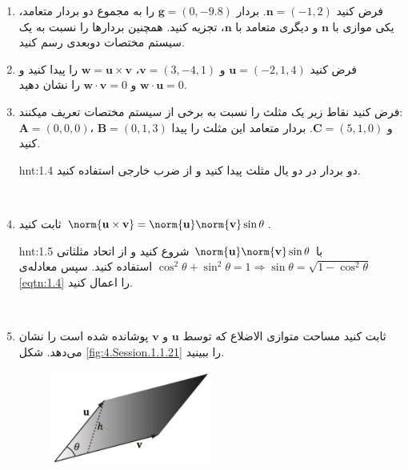 {\begin{spacing}{1.5}
\begin{enumerate}[label=\textbf{\arabic*}.]
\begin{hint}{hnt:1.3}
            \end{hint}
            \\
            \item {فرض کنید $\textbf{n}=(-1,2)$. بردار $\textbf{g}=(0,-9.8)$ را به مجموع دو بردار متعامد، یکی موازی با $\textbf{n}$ و دیگری متعامد با $\textbf{n}$، تجزیه کنید. همچنین بردارها را نسبت به یک سیستم مختصات دوبعدی رسم کنید.}
            \\
            \item {فرض کنید $\textbf{u}=(-2,1,4)$ و $\textbf{v}=(3,-4,1)$، $\textbf{w}=\textbf{u}\times\textbf{v}$ را پیدا کنید و $\textbf{w}\cdot\textbf{u}=0$ و $\textbf{w}\cdot\textbf{v}=0$ را نشان دهید.}
            \\
            \item {فرض کنید نقاط زیر یک مثلث را نسبت به برخی از سیستم مختصات تعریف میکنند:\\
                $\textbf{A}=(0,0,0)$، $\textbf{B}=(0,1,3)$ و $\textbf{C}=(5,1,0)$. بردار متعامد این مثلث را پیدا کنید.}
            \begin{hint}{hnt:1.4}
                \Large
                دو بردار در دو یال مثلث پیدا کنید و از ضرب خارجی استفاده کنید.
            \end{hint}
            \\
            \item \label{question:1.14} {ثابت کنید $\norm{\textbf{u}\times\textbf{v}}=\norm{\textbf{u}}\norm{\textbf{v}}\sin\theta$.}
            \begin{hint}{hnt:1.5}
                \Large
                با $\norm{\textbf{u}}\norm{\textbf{v}}\sin\theta$ شروع کنید و از اتحاد مثلثاتی $\cos^2\theta+\sin^2\theta=1\Longrightarrow\sin\theta=\sqrt{\displaystyle 1-\cos^2\theta}$ استفاده کنید. سپس معادله‌ی \ref{eqtn:1.4} را اعمال کنید.
            \end{hint}
            \\
            \item {ثابت کنید  مساحت متوازی الاضلاع که توسط $\textbf{u}$ و $\textbf{v}$ پوشانده شده است را نشان می‌دهد. شکل \ref{fig:4.Session.1.1.21} را ببینید.}
            \begin{figure}[H]
                \centering
                \setlength{\belowcaptionskip}{-10pt}
                \includegraphics[width=0.5\textwidth]{Images/4/1/4.Session.1.1.21}

\end{figure}
\end{enumerate}
\end{spacing}}
